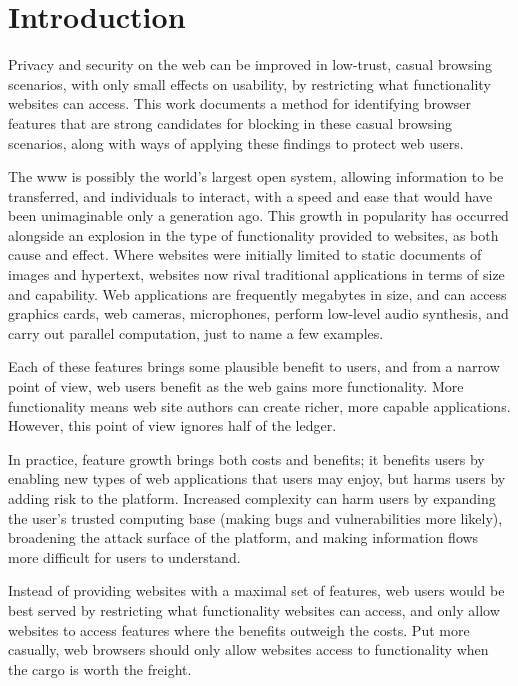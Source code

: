 \chapter{Introduction}
\label{intro}

Privacy and security on the web can be improved in low-trust, casual browsing
scenarios, with only small effects on usability, by restricting what
functionality websites can access.  This work documents a method for
identifying browser features that are strong candidates for blocking
in these casual browsing scenarios, along with ways of applying these findings
to protect web users.

The \gls{www} is possibly the world's largest open system, allowing information
to be transferred, and individuals to interact, with a speed and ease that would
have been unimaginable only a generation ago.  This growth in popularity
has occurred alongside an explosion in the type of functionality provided to
websites, as both cause and effect.  Where websites were initially limited
to static documents of images and hypertext, websites now rival traditional
applications in terms of size and capability.  Web applications are frequently
megabytes in size, and can access graphics cards, web cameras, microphones,
perform low-level audio synthesis, and carry out parallel computation, just to
name a few examples.

Each of these features brings some plausible benefit to users, and from a
narrow point of view, web users benefit as the web gains more functionality.
More functionality means web site authors can create richer, more capable
applications. However, this point of view ignores half of the ledger.

In practice, feature growth brings both costs and benefits; it benefits users
by enabling new types of web applications that users may enjoy, but
harms users by adding risk to the platform.  Increased complexity
can harm users by expanding the user's trusted computing base (making bugs and
vulnerabilities more likely), broadening the attack surface of the platform,
and making information flows more difficult for users to understand.

Instead of providing websites with a maximal set of features, web users would
be best served by restricting what functionality websites can access,
and only allow websites to access features where the benefits outweigh the
costs. Put more casually, web browsers should only allow websites access to
functionality when the cargo is worth the freight.

